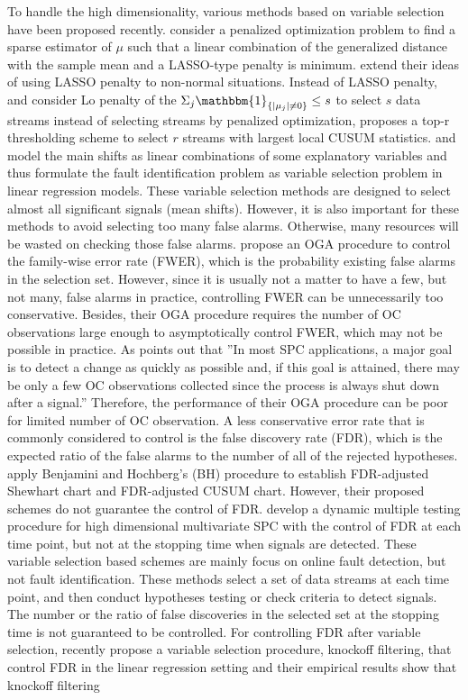 \documentclass[]{interact}
\theoremstyle{plain}%
\theoremstyle{definition}
\theoremstyle{remark}
\begin{document}
To handle the high dimensionality, various methods based on variable selection have been proposed recently. \cite{wang2009high} consider a penalized optimization problem to find a sparse estimator of $\mu$ such that a linear combination of the generalized distance with the sample mean and a LASSO-type penalty is minimum. \cite{liang2016robust} extend their ideas of using LASSO penalty to non-normal situations. Instead of LASSO penalty, \cite{jiang2012variable} and \cite{li2017robust} consider Lo penalty of the $\Sigma_j \mathbbm{1}_{ \{|\mu_j| \ne 0 \}} \le s$ to select $s$ data streams instead of selecting streams by penalized optimization, \cite{mei2011quickest} proposes a top-r thresholding scheme to select $r$ streams with largest local CUSUM statistics. \cite{capizzi2011least} and \cite{ing2017multiple} model the main shifts as linear combinations of some explanatory variables and thus formulate the fault identification problem as variable selection problem in linear regression models. These variable selection methods are designed to select almost all significant signals (mean shifts). However, it is also important for these methods to avoid selecting too many false alarms. Otherwise, many resources will be wasted on checking those false alarms. \cite{ing2017multiple} propose an OGA procedure to control the family-wise error rate (FWER), which is the probability existing false alarms in the selection set. However, since it is usually not a matter to have a few, but not many, false alarms in practice, controlling FWER can be unnecessarily too conservative. Besides, their OGA procedure requires the number of OC observations large enough to asymptotically control FWER, which may not be possible in practice. As \cite{li2020diagnostic} points out that ''In most SPC applications, a major goal is to detect a change as quickly as possible and, if this goal is attained, there may be only a few OC observations collected since the process is always shut down after a signal.'' Therefore, the performance of their OGA procedure can be poor for limited number of OC observation. A less conservative error rate that is commonly considered to control is the false discovery rate (FDR), which is the expected ratio of the false alarms to the number of all of the rejected hypotheses. \cite{li2009false} apply Benjamini and Hochberg's (BH) procedure to establish FDR-adjusted Shewhart chart and FDR-adjusted CUSUM chart. However, their proposed schemes do not guarantee the control of FDR. \cite{du2018line} develop a dynamic multiple testing procedure for high dimensional multivariate SPC with the control of FDR at each time point, but not at the stopping time when signals are detected. These variable selection based schemes are mainly focus on online fault detection, but not fault identification. These methods select a set of data streams at each time point, and then conduct hypotheses testing or check criteria to detect signals. The number or the ratio of false discoveries in the selected set at the stopping time is not guaranteed to be controlled. For controlling FDR after variable selection, recently \cite{barber2015controlling} propose a variable selection procedure, knockoff filtering, that control FDR in the linear regression setting and their empirical results show that knockoff filtering 
\end{document}
